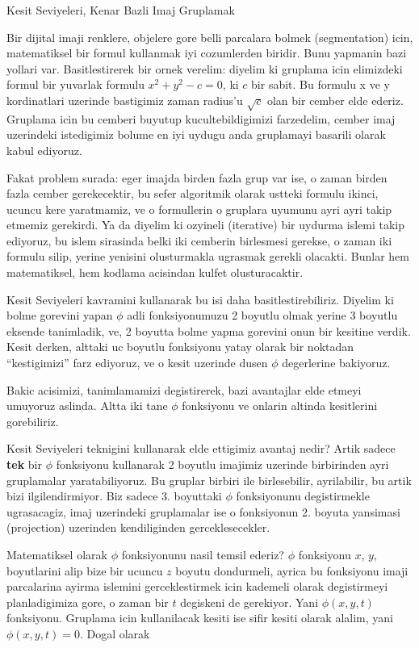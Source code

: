\documentclass[12pt,fleqn]{article}\usepackage{../common}
\begin{document}
Kesit Seviyeleri, Kenar Bazli Imaj Gruplamak

Bir dijital imaji renklere, objelere gore belli parcalara bolmek
(segmentation) icin, matematiksel bir formul kullanmak iyi cozumlerden
biridir. Bunu yapmanin bazi yollari var. Basitlestirerek bir ornek
verelim: diyelim ki gruplama icin elimizdeki formul bir yuvarlak
formulu $x^2+y^2 - c = 0$, ki $c$ bir sabit. Bu formulu x ve y
kordinatlari uzerinde bastigimiz zaman radius'u $\sqrt{c}$ olan bir
cember elde ederiz. Gruplama icin bu cemberi buyutup
kucultebildigimizi farzedelim, cember imaj uzerindeki istedigimiz
bolume en iyi uydugu anda gruplamayi basarili olarak kabul ediyoruz.

Fakat problem surada: eger imajda birden fazla grup var ise, o zaman
birden fazla cember gerekecektir, bu sefer algoritmik olarak ustteki
formulu ikinci, ucuncu kere yaratmamiz, ve o formullerin o gruplara
uyumunu ayri ayri takip etmemiz gerekirdi. Ya da diyelim ki ozyineli
(iterative) bir uydurma islemi takip ediyoruz, bu islem sirasinda
belki iki cemberin birlesmesi gerekse, o zaman iki formulu silip,
yerine yenisini olusturmakla ugrasmak gerekli olacakti. Bunlar hem
matematiksel, hem kodlama acisindan kulfet olusturacaktir.

Kesit Seviyeleri kavramini kullanarak bu isi daha
basitlestirebiliriz. Diyelim ki bolme gorevini yapan $\phi$ adli
fonksiyonumuzu 2 boyutlu olmak yerine 3 boyutlu eksende tanimladik,
ve, 2 boyutta bolme yapma gorevini onun bir kesitine verdik. Kesit
derken, alttaki uc boyutlu fonksiyonu yatay olarak bir noktadan
``kestigimizi'' farz ediyoruz, ve o kesit uzerinde dusen $\phi$
degerlerine bakiyoruz.

Bakic acisimizi, tanimlamamizi degistirerek, bazi avantajlar elde
etmeyi umuyoruz aslinda. Altta iki tane $\phi$ fonksiyonu ve onlarin
altinda kesitlerini gorebiliriz.


Kesit Seviyeleri teknigini kullanarak elde ettigimiz avantaj nedir?
Artik sadece \textbf{tek} bir $\phi$ fonksiyonu kullanarak 2 boyutlu
imajimiz uzerinde birbirinden ayri gruplamalar yaratabiliyoruz. Bu
gruplar birbiri ile birlesebilir, ayrilabilir, bu artik bizi
ilgilendirmiyor. Biz sadece 3. boyuttaki $\phi$ fonksiyonunu
degistirmekle ugrasacagiz, imaj uzerindeki gruplamalar ise o
fonksiyonun 2. boyuta yansimasi (projection) uzerinden kendiliginden
gerceklesecekler.

Matematiksel olarak $\phi$ fonksiyonunu nasil temsil ederiz? $\phi$
fonksiyonu $x$, $y$, boyutlarini alip bize bir ucuncu $z$ boyutu
dondurmeli, ayrica bu fonksiyonu imaji parcalarina ayirma islemini
gerceklestirmek icin kademeli olarak degistirmeyi planladigimiza gore,
o zaman bir $t$ degiskeni de gerekiyor. Yani $\phi(x,y,t)$
fonksiyonu. Gruplama icin kullanilacak kesiti ise sifir kesiti olarak
alalim, yani $\phi(x,y,t) = 0$. Dogal olarak
\end{document}

